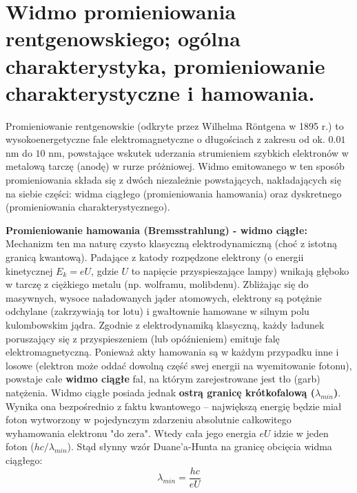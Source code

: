 \documentclass[11pt, a4paper]{article}
\begin{document}
\section{Widmo promieniowania rentgenowskiego; ogólna charakterystyka, promieniowanie charakterystyczne i hamowania.}

Promieniowanie rentgenowskie (odkryte przez Wilhelma Röntgena w 1895 r.) to wysokoenergetyczne fale elektromagnetyczne o długościach z zakresu od ok. $0.01$ nm do $10$ nm, powstające wskutek uderzania strumieniem szybkich elektronów w metalową tarczę (anodę) w rurze próżniowej. Widmo emitowanego w ten sposób promieniowania składa się z dwóch niezależnie powstających, nakładających się na siebie części: widma ciągłego (promieniowania hamowania) oraz dyskretnego (promieniowania charakterystycznego).

\textbf{Promieniowanie hamowania (Bremsstrahlung) - widmo ciągłe:}
Mechanizm ten ma naturę czysto klasyczną elektrodynamiczną (choć z istotną granicą kwantową). Padające z katody rozpędzone elektrony (o energii kinetycznej $E_k = eU$, gdzie $U$ to napięcie przyspieszające lampy) wnikają głęboko w tarczę z ciężkiego metalu (np. wolframu, molibdenu). Zbliżając się do masywnych, wysoce naładowanych jąder atomowych, elektrony są potężnie odchylane (zakrzywiają tor lotu) i gwałtownie hamowane w silnym polu kulombowskim jądra.
Zgodnie z elektrodynamiką klasyczną, każdy ładunek poruszający się z przyspieszeniem (lub opóźnieniem) emituje falę elektromagnetyczną. Ponieważ akty hamowania są w każdym przypadku inne i losowe (elektron może oddać dowolną część swej energii na wyemitowanie fotonu), powstaje całe \textbf{widmo ciągłe} fal, na którym zarejestrowane jest tło (garb) natężenia.
Widmo ciągłe posiada jednak \textbf{ostrą granicę krótkofalową ($\lambda_{min}$)}. Wynika ona bezpośrednio z faktu kwantowego – największą energię będzie miał foton wytworzony w pojedynczym zdarzeniu absolutnie całkowitego wyhamowania elektronu "do zera". Wtedy cała jego energia $eU$ idzie w jeden foton ($hc/\lambda_{min}$). Stąd słynny wzór Duane'a-Hunta na granicę obcięcia widma ciągłego:
\[
\lambda_{min} = \frac{hc}{eU}
\]
\end{document}
